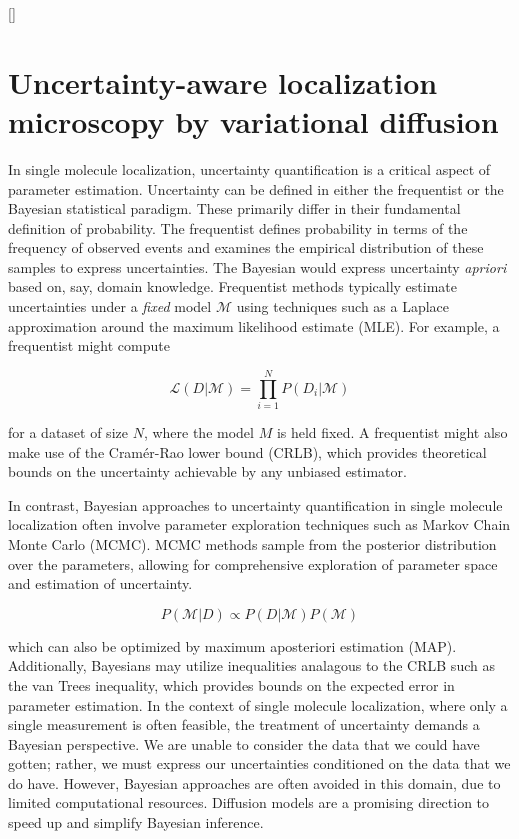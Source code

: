 []

\chapter{Uncertainty-aware localization microscopy by variational diffusion}

In single molecule localization, uncertainty quantification is a critical aspect of parameter estimation. Uncertainty can be defined in either the frequentist or the Bayesian statistical paradigm. These primarily differ in their fundamental definition of probability. The frequentist defines probability in terms of the frequency of observed events and examines the empirical distribution of these samples to express uncertainties. The Bayesian would express uncertainty \emph{apriori} based on, say, domain knowledge. Frequentist methods typically estimate uncertainties under a \emph{fixed} model $\mathcal{M}$ using techniques such as a Laplace approximation around the maximum likelihood estimate (MLE). For example, a frequentist might compute

\begin{equation*}
\mathcal{L}(D\lvert\mathcal{M}) = \prod_{i=1}^{N} P(D_{i}\lvert\mathcal{M})
\end{equation*}

for a dataset of size $N$, where the model $M$ is held fixed. A frequentist might also make use of the Cramér-Rao lower bound (CRLB), which provides theoretical bounds on the uncertainty achievable by any unbiased estimator. 

In contrast, Bayesian approaches to uncertainty quantification in single molecule localization often involve parameter exploration techniques such as Markov Chain Monte Carlo (MCMC). MCMC methods sample from the posterior distribution over the parameters, allowing for comprehensive exploration of parameter space and estimation of uncertainty.

\begin{equation*}
P(\mathcal{M}\lvert D) \propto P(D\lvert\mathcal{M})P(\mathcal{M})
\end{equation*}

which can also be optimized by maximum aposteriori estimation (MAP). Additionally, Bayesians may utilize inequalities analagous to the CRLB such as the van Trees inequality, which provides bounds on the expected error in parameter estimation. In the context of single molecule localization, where only a single measurement is often feasible, the treatment of uncertainty demands a Bayesian perspective. We are unable to consider the data that we could have gotten; rather, we must express our uncertainties conditioned on the data that we do have. However, Bayesian approaches are often avoided in this domain, due to limited computational resources. Diffusion models are a promising direction to speed up and simplify Bayesian inference. 